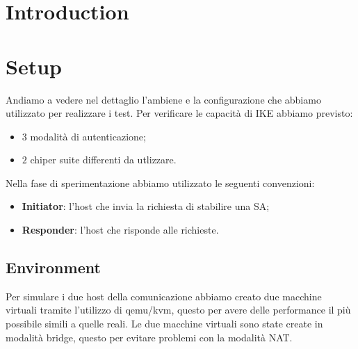\documentclass[
10pt, %
a4paper, %
oneside, %
headinclude,footinclude, %
BCOR5mm, %
]{scrartcl}
\begin{document}

\newpage %


\section{Introduction}



\newpage

\section{Setup}

Andiamo a vedere nel dettaglio l'ambiene e la configurazione che abbiamo utilizzato per realizzare i test. Per verificare le capacità di IKE abbiamo previsto:
\begin{itemize}
    \item $3$ modalità di autenticazione;
    \item $2$ chiper suite differenti da utlizzare.
\end{itemize}

\noindent
Nella fase di sperimentazione abbiamo utilizzato le seguenti convenzioni:
\begin{itemize}
    \item \textbf{Initiator}: l'host che invia la richiesta di stabilire una SA;
    \item \textbf{Responder}: l'host che risponde alle richieste.
\end{itemize}


\subsection{Environment}

Per simulare i due host della comunicazione abbiamo creato due macchine virtuali tramite l'utilizzo di qemu/kvm, questo per avere 
delle performance il più possibile simili a quelle reali. Le due macchine virtuali sono state create in modalità bridge, questo per evitare problemi con la modalità NAT.
\end{document}
